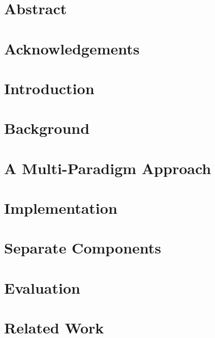 \documentclass[11pt]{article}
\begin{document}

\clearpage

\onehalfspacing{}

\section*{Abstract}
\label{sec:abstract}

\clearpage

\section*{Acknowledgements}
\label{sec:acknow}

\clearpage

\tableofcontents
\clearpage

\section{Introduction}
\label{sec:intro}


\clearpage
\section{Background}
\label{sec:background}


\clearpage
\section{A Multi-Paradigm Approach}
\label{sec:design}


\clearpage
\section{Implementation}
\label{sec:implementation}


\clearpage
\section{Separate Components}
\label{sec:separate-components}


\clearpage
\section{Evaluation}
\label{sec:evaluation}


\clearpage
\section{Related Work}
\label{sec:related-work}

\end{document}
